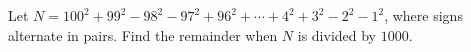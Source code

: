 Let $N=100^2+99^2-98^2-97^2+96^2+\cdots+4^2+3^2-2^2-1^2$, where signs alternate in pairs. Find the remainder when $N$ is divided by $1000$.
